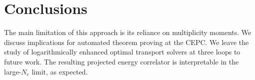 \section{Conclusions}\label{sec:conclusions}

The main limitation of this approach is its reliance on multiplicity
moments. We discuss implications for automated theorem proving at the
CEPC. We leave the study of logarithmically enhanced optimal transport
solvers at three loops to future work. The resulting projected energy
correlator is interpretable in the large-$N_c$ limit, as expected.

